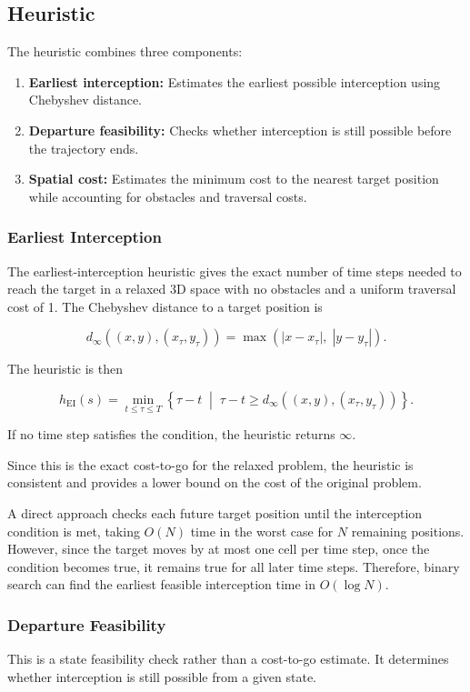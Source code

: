 \documentclass[11pt]{article}
\begin{document}
\subsection{Heuristic}
The heuristic combines three components:
\begin{enumerate}
  \item \textbf{Earliest interception:} Estimates the earliest possible interception using Chebyshev distance.
  \item \textbf{Departure feasibility:} Checks whether interception is still possible before the trajectory ends.
  \item \textbf{Spatial cost:} Estimates the minimum cost to the nearest target position while accounting for obstacles and traversal costs.
\end{enumerate}


\subsubsection{Earliest Interception}
The earliest-interception heuristic gives the exact number of time steps needed to reach the target in a relaxed 3D space with no obstacles and a uniform traversal cost of 1. The Chebyshev distance to a target position is

\[
  d_\infty\!\left((x,y),(x_\tau,y_\tau)\right)
  =
  \max\left(|x-x_\tau|,\;|y-y_\tau|\right).
\]

The heuristic is then

\[
  h_{\mathrm{EI}}(s)
  =
  \min_{t \leq \tau \leq T}
  \left\{
  \tau-t
  \;\middle|\;
  \tau-t \geq
  d_\infty\!\left((x,y),(x_\tau,y_\tau)\right)
  \right\}.
\]

If no time step satisfies the condition, the heuristic returns \(\infty\).

Since this is the exact cost-to-go for the relaxed problem, the heuristic is consistent and provides a lower bound on the cost of the original problem.

A direct approach checks each future target position until the interception condition is met, taking \(O(N)\) time in the worst case for \(N\) remaining positions. However, since the target moves by at most one cell per time step, once the condition becomes true, it remains true for all later time steps. Therefore, binary search can find the earliest feasible interception time in \(O(\log N)\).

\subsubsection{Departure Feasibility}
This is a state feasibility check rather than a cost-to-go estimate. It determines whether interception is still possible from a given state.
\end{document}
